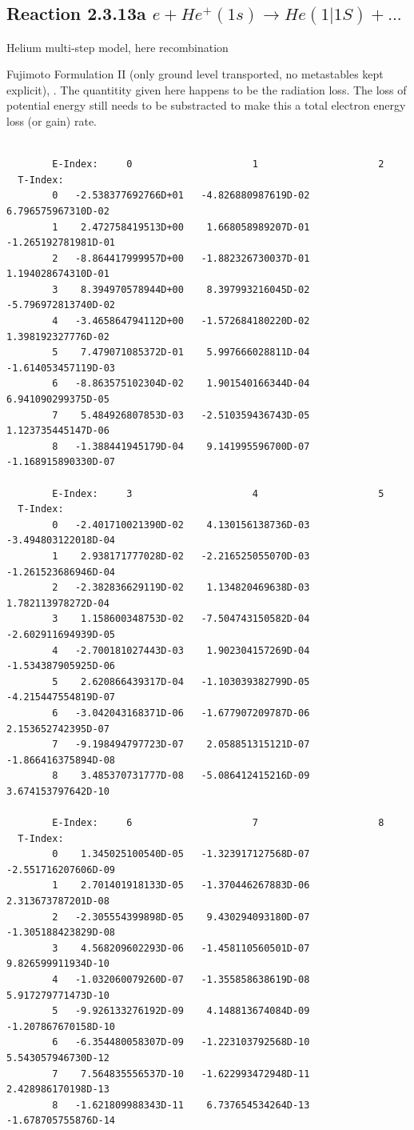 \documentclass[12pt,dvips]{article}
\begin{document}
\subsection{
Reaction 2.3.13a $e+ He^+(1s) \rightarrow   He(1|1S)+ ...$
}
Helium multi-step model, here recombination

 Fujimoto Formulation II (only ground level transported, no metastables
 kept explicit), \cite{kn:Fujimoto}.
 The quantitity given here happens to be the radiation loss.
 The loss of potential energy still needs to be substracted to make
 this a total electron energy loss (or gain) rate.



\begin{small}\begin{verbatim}

        E-Index:     0                     1                     2
  T-Index:
        0   -2.538377692766D+01   -4.826880987619D-02    6.796575967310D-02
        1    2.472758419513D+00    1.668058989207D-01   -1.265192781981D-01
        2   -8.864417999957D+00   -1.882326730037D-01    1.194028674310D-01
        3    8.394970578944D+00    8.397993216045D-02   -5.796972813740D-02
        4   -3.465864794112D+00   -1.572684180220D-02    1.398192327776D-02
        5    7.479071085372D-01    5.997666028811D-04   -1.614053457119D-03
        6   -8.863575102304D-02    1.901540166344D-04    6.941090299375D-05
        7    5.484926807853D-03   -2.510359436743D-05    1.123735445147D-06
        8   -1.388441945179D-04    9.141995596700D-07   -1.168915890330D-07

        E-Index:     3                     4                     5
  T-Index:
        0   -2.401710021390D-02    4.130156138736D-03   -3.494803122018D-04
        1    2.938171777028D-02   -2.216525055070D-03   -1.261523686946D-04
        2   -2.382836629119D-02    1.134820469638D-03    1.782113978272D-04
        3    1.158600348753D-02   -7.504743150582D-04   -2.602911694939D-05
        4   -2.700181027443D-03    1.902304157269D-04   -1.534387905925D-06
        5    2.620866439317D-04   -1.103039382799D-05   -4.215447554819D-07
        6   -3.042043168371D-06   -1.677907209787D-06    2.153652742395D-07
        7   -9.198494797723D-07    2.058851315121D-07   -1.866416375894D-08
        8    3.485370731777D-08   -5.086412415216D-09    3.674153797642D-10

        E-Index:     6                     7                     8
  T-Index:
        0    1.345025100540D-05   -1.323917127568D-07   -2.551716207606D-09
        1    2.701401918133D-05   -1.370446267883D-06    2.313673787201D-08
        2   -2.305554399898D-05    9.430294093180D-07   -1.305188423829D-08
        3    4.568209602293D-06   -1.458110560501D-07    9.826599911934D-10
        4   -1.032060079260D-07   -1.355858638619D-08    5.917279771473D-10
        5   -9.926133276192D-09    4.148813674084D-09   -1.207867670158D-10
        6   -6.354480058307D-09   -1.223103792568D-10    5.543057946730D-12
        7    7.564835556537D-10   -1.622993472948D-11    2.428986170198D-13
        8   -1.621809988343D-11    6.737654534264D-13   -1.678705755876D-14


\end{verbatim}
\end{small}
\end{document}
